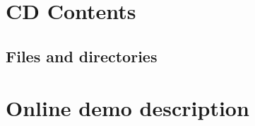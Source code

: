 \appendix
\chapter{CD Contents}

\section{Files and directories}








\page
\chapter{Online demo description}



\page
